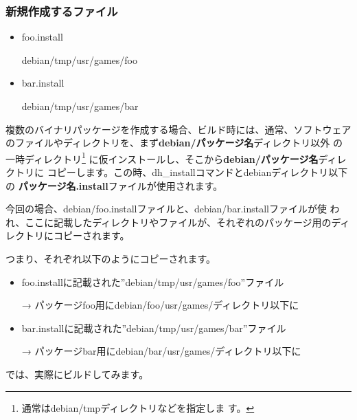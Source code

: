 \documentclass[mingoth,a4paper]{jsarticle}
\begin{document}
\subsubsection{新規作成するファイル}
\begin{itemize}
 \item
      foo.install
      \begin{commandline}
debian/tmp/usr/games/foo
      \end{commandline}
 \item
      bar.install
      \begin{commandline}
debian/tmp/usr/games/bar
      \end{commandline}
\end{itemize}

複数のバイナリパッケージを作成する場合、ビルド時には、通常、ソフトウェア
のファイルやディレクトリを、まず{\bf debian/パッケージ名}ディレクトリ以外
の一時ディレクトリ\footnote{通常はdebian/tmpディレクトリなどを指定しま
す。} に仮インストールし、そこから{\bf debian/パッケージ名}ディレクトリに
コピーします。この時、dh\_installコマンドとdebianディレクトリ以下の{\bf
パッケージ名.install}ファイルが使用されます。


今回の場合、debian/foo.installファイルと、debian/bar.installファイルが使
われ、ここに記載したディレクトリやファイルが、それぞれのパッケージ用のディ
レクトリにコピーされます。

つまり、それぞれ以下のようにコピーされます。
\begin{itemize}
 \item
     foo.installに記載された''debian/tmp/usr/games/foo''ファイル

	   → パッケージfoo用にdebian/foo/usr/games/ディレクトリ以下に

 \item
      bar.installに記載された''debian/tmp/usr/games/bar''ファイル

      → パッケージbar用にdebian/bar/usr/games/ディレクトリ以下に

\end{itemize}

では、実際にビルドしてみます。
\end{document}
